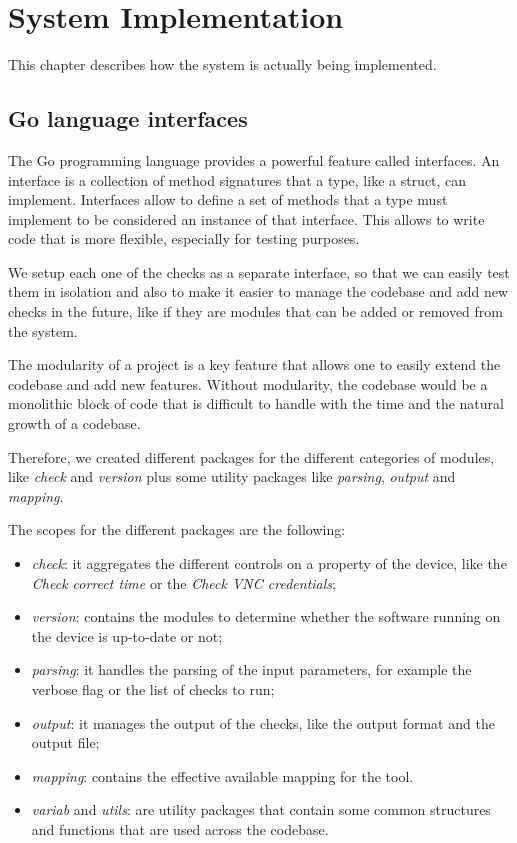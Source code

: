 \chapter{System Implementation}

This chapter describes how the system is actually being implemented.

\section{Go language interfaces}

The Go programming language provides a powerful feature called interfaces. An interface is a collection of method signatures that a type, like a struct, can implement. Interfaces allow to define a set of methods that a type must implement to be considered an instance of that interface. This allows to write code that is more flexible, especially for testing purposes.

We setup each one of the checks as a separate interface, so that we can easily test them in isolation and also to make it easier to manage the codebase and add new checks in the future, like if they are modules that can be added or removed from the system.

The modularity of a project is a key feature that allows one to easily extend the codebase and add new features. Without modularity, the codebase would be a monolithic block of code that is difficult to handle with the time and the natural growth of a codebase.

Therefore, we created different packages for the different categories of modules, like \textit{check} and \textit{version} plus some utility packages like \textit{parsing}, \textit{output} and \textit{mapping}.

The scopes for the different packages are the following:

\begin{itemize}
  \item \textit{check}: it aggregates the different controls on a property of the device, like the \textit{Check correct time} or the \textit{Check VNC credentials};
  \item \textit{version}: contains the modules to determine whether the software running on the device is up-to-date or not;
  \item \textit{parsing}: it handles the parsing of the input parameters, for example the verbose flag or the list of checks to run;
  \item \textit{output}: it manages the output of the checks, like the output format and the output file;
  \item \textit{mapping}: contains the effective available mapping for the tool.
  \item \textit{variab} and \textit{utils}: are utility packages that contain some common structures and functions that are used across the codebase.
\end{itemize}

